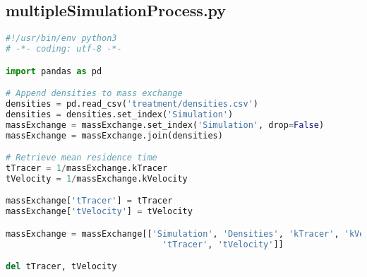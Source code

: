 \documentclass[../main.tex]{subfiles}
\begin{document}
\subsection{multipleSimulationProcess.py}
\begin{lstlisting}[language=python]
#!/usr/bin/env python3
# -*- coding: utf-8 -*-

import pandas as pd

# Append densities to mass exchange
densities = pd.read_csv('treatment/densities.csv')
densities = densities.set_index('Simulation')
massExchange = massExchange.set_index('Simulation', drop=False)
massExchange = massExchange.join(densities)

# Retrieve mean residence time
tTracer = 1/massExchange.kTracer
tVelocity = 1/massExchange.kVelocity

massExchange['tTracer'] = tTracer
massExchange['tVelocity'] = tVelocity

massExchange = massExchange[['Simulation', 'Densities', 'kTracer', 'kVelocity',
                               'tTracer', 'tVelocity']]

del tTracer, tVelocity
\end{lstlisting}
\end{document}

